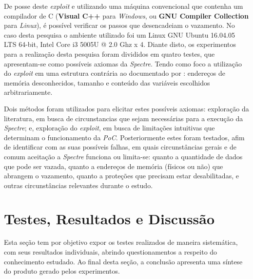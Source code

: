 \documentclass[
	article,			    %
	12pt,				    %
	oneside,			    %
	a4paper,			    %
	chapter=TITLE,		    %
	section=TITLE,		    %
	subsection=TITLE,	    %
	english,			    %
	brazil,				    %
	sumario=tradicional
]{abntex2}
\begin{document}
De posse deste \emph{exploit} e utilizando uma máquina convencional que contenha um compilador de C (\textbf{Visual C++} para \emph{Windows}, ou \textbf{GNU Compiler Collection} para \emph{Linux}), é possível verificar os passos que desencadeiam o vazamento. No caso desta pesquisa o ambiente utilizado foi um Linux GNU Ubuntu 16.04.05 LTS 64-bit, Intel\textsuperscript{\tiny\textregistered} Core\textsuperscript{\tiny\texttrademark} i3 5005U @ 2.0 Ghz x 4. Diante disto, os experimentos para a realização desta pesquisa foram divididos em quatro testes, que apresentam-se como possíveis axiomas da \emph{Spectre}. Tendo como foco a utilização do \emph{exploit} em uma estrutura contrária ao documentado por : endereços de memória desconhecidos, tamanho e conteúdo das variáveis escolhidos arbitrariamente.

Dois métodos foram utilizados para elicitar estes possíveis axiomas: exploração da literatura, em busca de circunstancias que sejam necessárias para a execução da \emph{Spectre}; e, exploração do \emph{exploit}, em busca de limitações intuitivas que determinam o funcionamento da \emph{PoC}. Posteriormente estes foram testados, afim de identificar com as suas possíveis falhas, em quais circunstâncias gerais e de comum aceitação a \emph{Spectre} funciona ou limita-se: quanto a quantidade de dados que pode ser vazada, quanto a endereços de memória (físicos ou não) que abrangem o vazamento, quanto a proteções que precisam estar desabilitadas, e outras circunstâncias relevantes durante o estudo.

\begin{comment}
Para a realização dos passos supradescritos, os ambientes utilizados foram: GNU Ubuntu 18.04.01 LTS 64-bit, Intel\textsuperscript{\tiny\textregistered} Core\textsuperscript{\tiny\texttrademark} i7 7500U @ 2.7 Ghz x 4; GNU Ubuntu 16.04.05 LTS 64-bit, Intel\textsuperscript{\tiny\textregistered} Core\textsuperscript{\tiny\texttrademark} i3 5005U @ 2.0 Ghz x 4.
\end{comment}

\section{Testes, Resultados e Discussão}
Esta seção tem por objetivo expor os testes realizados de maneira sistemática, com seus resultados individuais, abrindo questionamentos a respeito do conhecimento estudado. Ao final desta seção, a conclusão apresenta uma síntese do produto gerado pelos experimentos.
\end{document}
